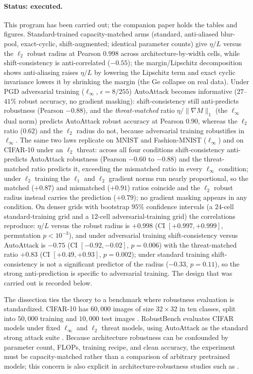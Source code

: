 \documentclass[11pt]{article}
\theoremstyle{plain}
\theoremstyle{definition}
\theoremstyle{remark}
\begin{document}
\paragraph{Status: executed.}  This program has been carried out; the companion paper holds the tables and figures.  Standard-trained capacity-matched arms (standard, anti-aliased blur-pool, exact-cyclic, shift-augmented; identical parameter counts) give $\eta/L$ versus the $\ell_2$ robust radius at Pearson $0.998$ across architecture-by-width cells, while shift-consistency is anti-correlated ($-0.55$); the margin/Lipschitz decomposition shows anti-aliasing raises $\eta/L$ by lowering the Lipschitz term and exact cyclic invariance lowers it by shrinking the margin (the Ge collapse on real data).  Under PGD adversarial training ($\ell_\infty$, $\epsilon=8/255$) AutoAttack becomes informative ($27$--$41\%$ robust accuracy, no gradient masking): shift-consistency still anti-predicts robustness (Pearson $-0.88$), and the \emph{threat-matched} ratio $\eta/\|\nabla M\|_1$ (the $\ell_\infty$ dual norm) predicts AutoAttack robust accuracy at Pearson $0.90$, whereas the $\ell_2$ ratio ($0.62$) and the $\ell_2$ radius do not, because adversarial training robustifies in $\ell_\infty$.  The same two laws replicate on MNIST and Fashion-MNIST ($\ell_\infty$) and on CIFAR-10 under an $\ell_2$ threat: across all four conditions shift-consistency anti-predicts AutoAttack robustness (Pearson $-0.60$ to $-0.88$) and the threat-matched ratio predicts it, exceeding the mismatched ratio in every $\ell_\infty$ condition; under $\ell_2$ training the $\ell_1$ and $\ell_2$ gradient norms run nearly proportional, so the matched ($+0.87$) and mismatched ($+0.91$) ratios coincide and the $\ell_2$ robust radius instead carries the prediction ($+0.79$); no gradient masking appears in any condition.  On denser grids with bootstrap $95\%$ confidence intervals (a $24$-cell standard-training grid and a $12$-cell adversarial-training grid) the correlations reproduce: $\eta/L$ versus the robust radius is $+0.998$ (CI $[+0.997,+0.999]$, permutation $p<10^{-3}$), and under adversarial training shift-consistency versus AutoAttack is $-0.75$ (CI $[-0.92,-0.02]$, $p=0.006$) with the threat-matched ratio $+0.83$ (CI $[+0.49,+0.93]$, $p=0.002$); under standard training shift-consistency is not a significant predictor of the radius ($-0.33$, $p=0.11$), so the strong anti-prediction is specific to adversarial training.  The design that was carried out is recorded below.

The dissection ties the theory to a benchmark where robustness evaluation is standardized.  CIFAR-10 has $60{,}000$ images of size $32\times32$ in ten classes, split into $50{,}000$ training and $10{,}000$ test images \citep{Krizhevsky2009}.  RobustBench evaluates CIFAR models under fixed $\ell_\infty$ and $\ell_2$ threat models, using AutoAttack as the standard strong attack suite \citep{AutoAttack2020,RobustBench2020}.  Because architecture robustness can be confounded by parameter count, FLOPs, training recipe, and clean accuracy, the experiment must be capacity-matched rather than a comparison of arbitrary pretrained models; this concern is also explicit in architecture-robustness studies such as \citet{RobArch2023}.
\end{document}
